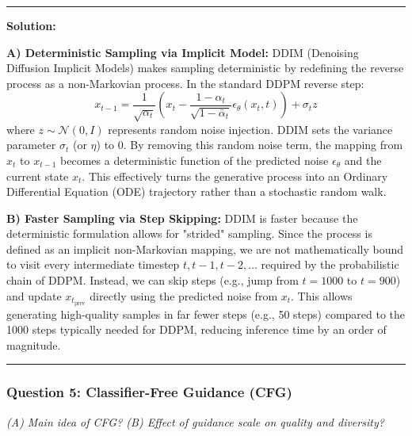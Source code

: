 \documentclass[a4paper,12pt]{article}
\newenvironment{solutionbox}{
    \par
    \vspace{0.5em}
    \noindent
    {\color{primary}\rule{\linewidth}{0.4pt}}
    \par\smallskip
    \noindent\textbf{\color{primary}Solution:}
    \par\smallskip
    \small
}{
    \par\smallskip
    {\color{primary}\rule{\linewidth}{0.4pt}}
    \par\vspace{0.5em}
}
\begin{document}
\begin{solutionbox}
    \textbf{A) Deterministic Sampling via Implicit Model:}
    DDIM (Denoising Diffusion Implicit Models) makes sampling deterministic by redefining the reverse process as a non-Markovian process. In the standard DDPM reverse step:
    \[ x_{t-1} = \frac{1}{\sqrt{\alpha_t}} \left( x_t - \frac{1-\alpha_t}{\sqrt{1-\bar{\alpha}_t}} \epsilon_\theta(x_t, t) \right) + \sigma_t z \]
    where $z \sim \mathcal{N}(0, I)$ represents random noise injection. DDIM sets the variance parameter $\sigma_t$ (or $\eta$) to $0$. By removing this random noise term, the mapping from $x_t$ to $x_{t-1}$ becomes a deterministic function of the predicted noise $\epsilon_\theta$ and the current state $x_t$. This effectively turns the generative process into an Ordinary Differential Equation (ODE) trajectory rather than a stochastic random walk.

    \textbf{B) Faster Sampling via Step Skipping:}
    DDIM is faster because the deterministic formulation allows for "strided" sampling. Since the process is defined as an implicit non-Markovian mapping, we are not mathematically bound to visit every intermediate timestep $t, t-1, t-2, \dots$ required by the probabilistic chain of DDPM. Instead, we can skip steps (e.g., jump from $t=1000$ to $t=900$) and update $x_{t_{\text{prev}}}$ directly using the predicted noise from $x_t$. This allows generating high-quality samples in far fewer steps (e.g., 50 steps) compared to the 1000 steps typically needed for DDPM, reducing inference time by an order of magnitude.
\end{solutionbox}
\subsubsection{Question 5: Classifier-Free Guidance (CFG)}
\textit{(A) Main idea of CFG? (B) Effect of guidance scale on quality and diversity?}
\end{document}
